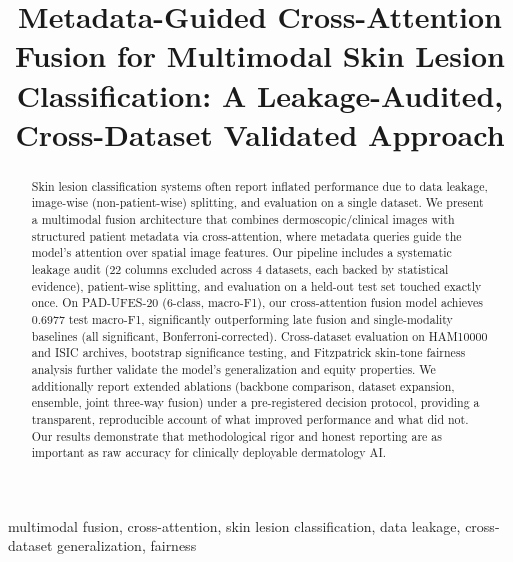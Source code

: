 \documentclass[conference]{IEEEtran}
\begin{document}
\title{Metadata-Guided Cross-Attention Fusion for Multimodal Skin Lesion Classification: A Leakage-Audited, Cross-Dataset Validated Approach}

\author{
}

\maketitle

\begin{abstract}
Skin lesion classification systems often report inflated performance due to data leakage, image-wise (non-patient-wise) splitting, and evaluation on a single dataset. We present a multimodal fusion architecture that combines dermoscopic/clinical images with structured patient metadata via cross-attention, where metadata queries guide the model's attention over spatial image features. Our pipeline includes a systematic leakage audit (22 columns excluded across 4 datasets, each backed by statistical evidence), patient-wise splitting, and evaluation on a held-out test set touched exactly once. On PAD-UFES-20 (6-class, macro-F1), our cross-attention fusion model achieves 0.6977 test macro-F1, significantly outperforming late fusion and single-modality baselines (all significant, Bonferroni-corrected). Cross-dataset evaluation on HAM10000 and ISIC archives, bootstrap significance testing, and Fitzpatrick skin-tone fairness analysis further validate the model's generalization and equity properties. We additionally report extended ablations (backbone comparison, dataset expansion, ensemble, joint three-way fusion) under a pre-registered decision protocol, providing a transparent, reproducible account of what improved performance and what did not. Our results demonstrate that methodological rigor and honest reporting are as important as raw accuracy for clinically deployable dermatology AI.
\end{abstract}

\begin{IEEEkeywords}
multimodal fusion, cross-attention, skin lesion classification, data leakage, cross-dataset generalization, fairness
\end{IEEEkeywords}
\end{document}
